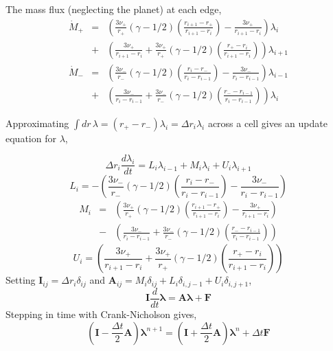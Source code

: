 \documentclass{article}
\begin{document}
The mass flux (neglecting the planet) at each edge,
\begin{eqnarray}
\dot{M}_+ &=& \left(\frac{3 \nu_+}{r_+} ( \gamma - 1/2) \left( \frac{ r_{i+1} -r_+}{r_{i+1}-r_i} \right) - \frac{3 \nu_+}{r_{i+1}-r_i} \right) \lambda_i \nonumber \\
&+& \left( \frac{3 \nu_+}{r_{i+1} - r_i}  +   \frac{3 \nu_+}{r_+}(\gamma - 1/2) \left( \frac{r_+ - r_i}{r_{i+1}-r_i} \right)\right) \lambda_{i+1}
\end{eqnarray}
\begin{eqnarray}
\dot{M}_- &=& \left(\frac{ 3\nu_-}{r_-} (\gamma - 1/2) \left( \frac{ r_{i} -r_-}{r_{i}-r_{i-1}} \right) - \frac{3 \nu_-}{r_i - r_{i-1}} \right) \lambda_{i-1} \nonumber \\
&+& \left( \frac{3 \nu_-}{r_i-r_{i-1}} +   \frac{ 3 \nu_-}{r_-} (\gamma -1/2) \left( \frac{r_- - r_{i-1}}{r_{i}-r_{i-1}} \right) \right) \lambda_i
\end{eqnarray}

Approximating $\int dr \, \lambda = (r_+ - r_-) \lambda_i = \Delta r_i \lambda_i$ across a cell gives an update equation for $\lambda$,

\begin{equation}
\Delta r_i \frac{d \lambda_i}{d t} = L_i \lambda_{i-1} + M_i \lambda_i + U_i \lambda_{i+1}
\end{equation}
\begin{equation}
L_i = - \left( \frac{ 3 \nu_-}{r_-} (\gamma - 1/2) \left( \frac{ r_{i} -r_-}{r_{i}-r_{i-1}} \right) - \frac{3 \nu_-}{r_i - r_{i-1}} \right) 
\end{equation}
\begin{eqnarray}
M_i &=& \left( \frac{3 \nu_+}{r_+} (\gamma -1/2) \left( \frac{ r_{i+1} -r_+}{r_{i+1}-r_i} \right) - \frac{3 \nu_+}{r_{i+1}-r_i} \right)  \nonumber \\
&-&  \left( \frac{3 \nu_-}{r_i-r_{i-1}} + \frac{ 3 \nu_-}{r_-} (\gamma -1/2)  \left( \frac{r_- - r_{i-1}}{r_{i}-r_{i-1}} \right) \right)
\end{eqnarray}
\begin{equation}
U_i = \left( \frac{3 \nu_+}{r_{i+1} - r_i}  +  \frac{3 \nu_+}{r_+} ( \gamma -1/2)\left( \frac{r_+ - r_i}{r_{i+1}-r_i} \right)\right) 
\end{equation}
Setting $\mathbf{I}_{ij} = \Delta r_i \delta_{ij}$ and $\mathbf{A}_{ij} = M_i \delta_{ij} + L_i \delta_{i,j-1} + U_i \delta_{i,j+1}$, 
\begin{equation}
\mathbf{I} \frac{d}{d t} \mathbf{\lambda} = \mathbf{A} \mathbf{\lambda} + \mathbf{F}
\end{equation}
Stepping in time with Crank-Nicholson gives,
\begin{equation}
\left( \mathbf{I} - \frac{\Delta t}{2} \mathbf{A} \right) \mathbf{\lambda}^{n+1} = \left( \mathbf{I} + \frac{\Delta t}{2} \mathbf{A} \right) \mathbf{\lambda}^n+ \Delta t \mathbf{F}
\end{equation}
\end{document}
